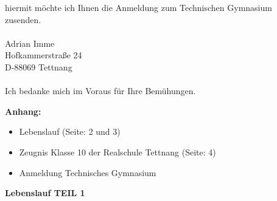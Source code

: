 \documentclass[12pt, german]{g-brief}
\begin{document}
\begin{g-brief}

hiermit möchte ich Ihnen die Anmeldung zum Technischen Gymnasium\\
 zusenden.\\
\\
Adrian Imme\\
Hofkammerstraße 24 \\
D-88069 Tettnang\\
\\
Ich bedanke mich im Voraus für Ihre Bemühungen.
\end{g-brief}

\vspace*{2cm}
{\bf Anhang:}
\begin{itemize}
\item Lebenslauf (Seite: 2 und 3)
\item Zeugnis Klasse 10 der Realschule Tettnang  (Seite: 4)
\item Anmeldung Technisches Gymnasium
\end{itemize}

\newpage

\begin{Large}
{\bfseries Lebenslauf TEIL 1}
\end{Large}
\end{document}
